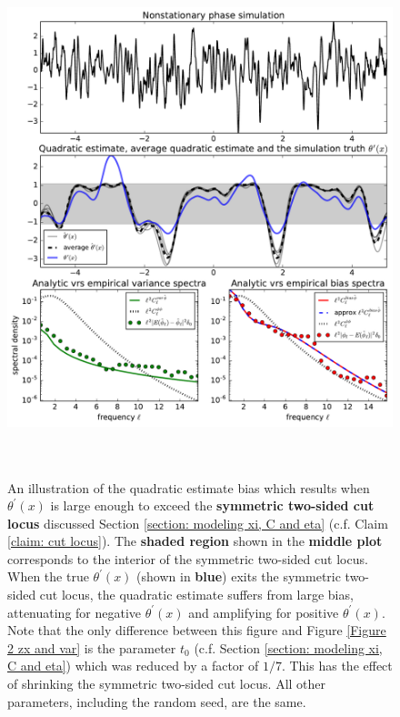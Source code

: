 \documentclass[10pt,noinfoline]{imsart}
\begin{document}
\begin{figure}
\includegraphics[height=15cm]{figure3.pdf}%
\caption{ An illustration of the quadratic estimate bias which results when $\theta^\prime(x)$ is large enough to exceed the \textbf{symmetric two-sided cut locus} discussed Section \ref{section: modeling xi, C and eta} (c.f. Claim \ref{claim: cut locus}). The \textbf{shaded region} shown in the \textbf{middle plot} corresponds to the interior of the symmetric two-sided cut locus. When the true  $\theta^\prime(x)$ (shown in \textbf{blue}) exits the symmetric two-sided cut locus, the quadratic estimate suffers from large bias, attenuating for negative $\theta^\prime(x)$ and amplifying for positive $\theta^\prime(x)$. Note that the only difference between this figure and Figure \ref{Figure 2 zx and var} is the parameter $t_0$ (c.f. Section \ref{section: modeling xi, C and eta}) which was reduced by a factor of $1/7$. This has the effect of shrinking the symmetric two-sided cut locus. All other parameters, including the random seed, are the same.}
\label{Figure 2 zx and var, extra bias}
\end{figure}
\end{document}
